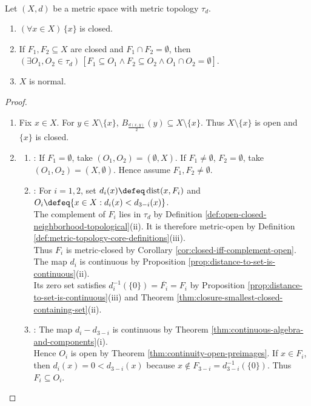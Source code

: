 \begin{proposition} \label{prop:metric-spaces-are-normal} \\
Let $(X,d)$ be a metric space with metric topology $\tau_d$.
\begin{enumerate}[label=(\roman*)]
\setlength{\itemsep}{0pt}
\item $(\forall x\in X)\,\{x\}$ is closed.
\item If $F_1,F_2\subseteq X$ are closed and $F_1\cap F_2=\emptyset$, then $(\exists O_1,O_2\in\tau_d)\,[F_1\subseteq O_1\land F_2\subseteq O_2\land O_1\cap O_2=\emptyset]$.
\item $X$ is normal.
\end{enumerate}
\begin{proof}
\begin{enumerate}[label=(\roman*)]
\setlength{\itemsep}{0pt}
\item Fix $x\in X$. For $y\in X\setminus\{x\}$, $B_{\frac{d(x,y)}{2}}(y)\subseteq X\setminus\{x\}$. Thus $X\setminus\{x\}$ is open and $\{x\}$ is closed.
\item
\begin{enumerate}[label=(\alph*)]
\setlength{\itemsep}{0pt}
\item {}: If $F_1=\emptyset$, take $(O_1,O_2)=(\emptyset,X)$. If $F_1\neq\emptyset$, $F_2=\emptyset$, take $(O_1,O_2)=(X,\emptyset)$. Hence assume $F_1,F_2\neq\emptyset$.
\item {}: For $i=1,2$, set $d_i(x)\defeq\operatorname{dist}(x,F_i)$ and $O_i\defeq\{x\in X:d_i(x)<d_{3-i}(x)\}$.\\
The complement of $F_i$ lies in $\tau_d$ by Definition \ref{def:open-closed-neighborhood-topological}(ii). It is therefore metric-open by Definition \ref{def:metric-topology-core-definitions}(iii).\\
Thus $F_i$ is metric-closed by Corollary \ref{cor:closed-iff-complement-open}. The map $d_i$ is continuous by Proposition \ref{prop:distance-to-set-is-continuous}(ii).\\
Its zero set satisfies $d_i^{-1}(\{0\})=\overline{F_i}=F_i$ by Proposition \ref{prop:distance-to-set-is-continuous}(iii) and Theorem \ref{thm:closure-smallest-closed-containing-set}(ii).
\item {}: The map $d_i-d_{3-i}$ is continuous by Theorem \ref{thm:continuous-algebra-and-components}(i).\\
Hence $O_i$ is open by Theorem \ref{thm:continuity-open-preimages}. If $x\in F_i$, then $d_i(x)=0<d_{3-i}(x)$ because $x\notin F_{3-i}=d_{3-i}^{-1}(\{0\})$. Thus $F_i\subseteq O_i$.

\end{enumerate}
\end{enumerate}
\end{proof}
\end{proposition}
